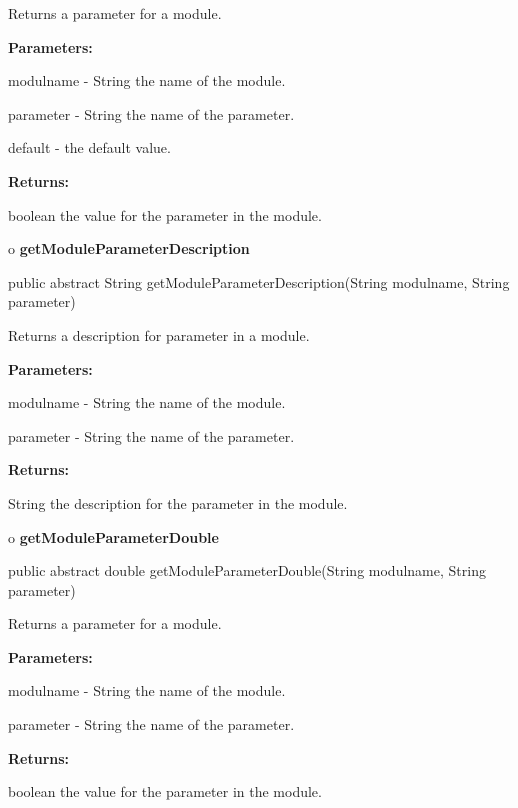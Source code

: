 \begin{description}
\htmlDD Returns a parameter for a module. 

\begin{description}
\item {\bf Parameters:}  

modulname - String the name of the module.  

parameter - String the name of the parameter.  

default - the default value.  
\item {\bf Returns:}  

boolean the value for the parameter in the module.  
\end{description}

\end{description}

o {\bf getModuleParameterDescription} 

\begin{PRE}
 public abstract String getModuleParameterDescription(String modulname,
                                                      String parameter)
\end{PRE}

\begin{description}
\htmlDD Returns a description for parameter in a module. 

\begin{description}
\item {\bf Parameters:}  

modulname - String the name of the module.  

parameter - String the name of the parameter.  
\item {\bf Returns:}  

String the description for the parameter in the module.  
\end{description}

\end{description}

o {\bf getModuleParameterDouble} 

\begin{PRE}
 public abstract double getModuleParameterDouble(String modulname,
                                                 String parameter)
\end{PRE}

\begin{description}
\htmlDD Returns a parameter for a module. 

\begin{description}
\item {\bf Parameters:}  

modulname - String the name of the module.  

parameter - String the name of the parameter.  
\item {\bf Returns:}  

boolean the value for the parameter in the module.  
\end{description}

\end{description}

